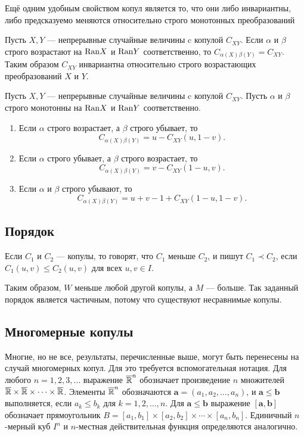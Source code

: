 Ещё одним удобным свойством копул является то, что они либо инвариантны, либо предсказуемо меняются относительно строго монотонных преобразований

\begin{theorem}\label{thm:copula_invariant}
	Пусть $X, Y$ --- непрерывные случайные величины c копулой $C_{XY}$. Если $\alpha$ и $\beta$ строго возрастают на $\mathrm{Ran}{X}$ и $\mathrm{Ran}{Y}$ соответственно, то $C_{\alpha(X)\beta(Y)} = C_{XY}$. Таким образом $C_{XY}$ инвариантна относительно строго возрастающих преобразований $X$ и $Y$.
\end{theorem}

\begin{theorem}
	Пусть $X, Y$ --- непрерывные случайные величины c копулой $C_{XY}$. Пусть $\alpha$ и $\beta$ строго монотонны на $\mathrm{Ran}{X}$ и $\mathrm{Ran}{Y}$ соответственно.
	\begin{enumerate}
	\item Если $\alpha$ строго возрастает, а $\beta$ строго убывает, то
	\[
	C_{\alpha(X)\beta(Y)} = u - C_{XY}(u, 1 - v).
	\]
	\item Если $\alpha$ строго убывает, а $\beta$ строго возрастает, то
	\[
	C_{\alpha(X)\beta(Y)} = v - C_{XY}(1 - u, v).
	\]
	\item Если $\alpha$ и $\beta$ строго убывают, то
	\[
	C_{\alpha(X)\beta(Y)} = u + v - 1 + C_{XY}(1 - u, 1 - v).
	\]
	\end{enumerate}
\end{theorem}

\subsection*{Порядок}

\begin{define}
	Если $C_1$ и $C_2$ --- копулы, то говорят, что $C_1$ меньше $C_2$, и пишут $C_1 \prec C_2$, если $C_1(u, v) \leqslant C_2(u, v)$ для всех $u, v \in I$.
\end{define}

Таким образом, $W$ меньше любой другой копулы, а $M$ --- больше. Так заданный порядок является частичным, потому что существуют несравнимые копулы.

\subsection*{Многомерные копулы}

Многие, но не все, результаты, перечисленные выше, могут быть перенесены на случай многомерных копул. Для это требуется вспомогательная нотация. Для любого $n = 1, 2, 3, \ldots$ выражение $\overline{\mathbb{R}}^n$ обозначает произведение $n$ множителей $\overline{\mathbb{R}} \times \overline{\mathbb{R}} \times \cdots \times \overline{\mathbb{R}}$. Элементы $\overline{\mathbb{R}}^n$ обозначаются $\bm{a} = (a_1, a_2, \ldots, a_n)$, и $\bm{a} \leqslant \bm{b}$ выполняется, если $a_k \leqslant b_k$ для $k = 1, 2, \ldots, n$. Для $\bm{a} \leqslant \bm{b}$ выражение $[\bm{a}, \bm{b}]$ обозначает прямоугольник $B = [a_1, b_1] \times [a_2, b_2] \times \cdots \times [a_n, b_n]$. Единичный $n$-мерный куб $I^n$ и $n$-местная действительная функция определяются аналогично.

